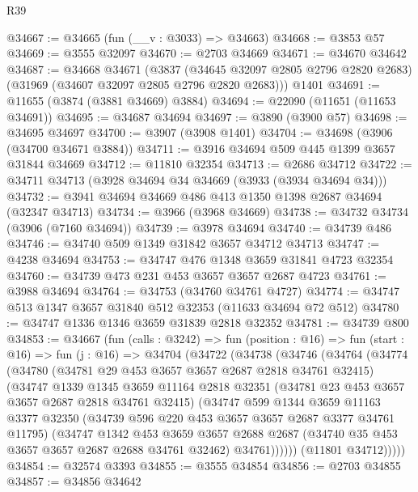 \begin{lexlean}{R39}
\begin{coremodule}
@34667 := @34665 (fun (__v : @3033) => @34663)
@34668 := @3853 @57
@34669 := @3555 @32097
@34670 := @2703 @34669
@34671 := @34670 @34642
@34687 := @34668
    @34671
    (@3837 (@34645 @32097 @2805 @2796 @2820 @2683) (@31969 (@34607 @32097 @2805 @2796 @2820 @2683)))
    @1401
@34691 := @11655 (@3874 (@3881 @34669) @3884)
@34694 := @22090 (@11651 (@11653 @34691))
@34695 := @34687 @34694
@34697 := @3890 (@3900 @57)
@34698 := @34695 @34697
@34700 := @3907 (@3908 @1401)
@34704 := @34698 (@3906 (@34700 @34671 @3884))
@34711 := @3916 @34694 @509 @445 @1399 @3657 @31844 @34669
@34712 := @11810 @32354
@34713 := @2686 @34712
@34722 := @34711 @34713 (@3928 @34694 @34 @34669 (@3933 (@3934 @34694 @34)))
@34732 := @3941 @34694 @34669 @486 @413 @1350 @1398 @2687 @34694 (@32347 @34713)
@34734 := @3966 (@3968 @34669)
@34738 := @34732 @34734 (@3906 (@7160 @34694))
@34739 := @3978 @34694
@34740 := @34739 @486
@34746 := @34740 @509 @1349 @31842 @3657 @34712 @34713
@34747 := @4238 @34694
@34753 := @34747 @476 @1348 @3659 @31841 @4723 @32354
@34760 := @34739 @473 @231 @453 @3657 @3657 @2687 @4723
@34761 := @3988 @34694
@34764 := @34753 (@34760 @34761 @4727)
@34774 := @34747 @513 @1347 @3657 @31840 @512 @32353 (@11633 @34694 @72 @512)
@34780 := @34747 @1336 @1346 @3659 @31839 @2818 @32352
@34781 := @34739 @800
@34853 := @34667
    (fun (calls : @3242) =>
    fun (position : @16) =>
    fun (start : @16) =>
    fun (j : @16) =>
    @34704
      (@34722
        (@34738
          (@34746
            (@34764
              (@34774
                (@34780
                  (@34781 @29 @453 @3657 @3657 @2687 @2818 @34761 @32415)
                  (@34747
                    @1339
                    @1345
                    @3659
                    @11164
                    @2818
                    @32351
                    (@34781 @23 @453 @3657 @3657 @2687 @2818 @34761 @32415)
                    (@34747
                      @599
                      @1344
                      @3659
                      @11163
                      @3377
                      @32350
                      (@34739 @596 @220 @453 @3657 @3657 @2687 @3377 @34761 @11795)
                      (@34747
                        @1342
                        @453
                        @3659
                        @3657
                        @2688
                        @2687
                        (@34740 @35 @453 @3657 @3657 @2687 @2688 @34761 @32462)
                        @34761))))))
            (@11801 @34712)))))
@34854 := @32574 @3393
@34855 := @3555 @34854
@34856 := @2703 @34855
@34857 := @34856 @34642

\end{coremodule}
\end{lexlean}
